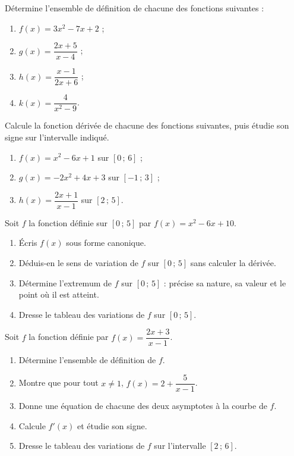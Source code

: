 \documentclass[11pt]{article}
\newcounter{popsec}
\newcounter{popsub}
\newcommand{\courssub}[1]{%
  \stepcounter{popsub}%
  \par\vspace{9pt}\noindent{\popxbold\fontsize{11.5}{13}\selectfont\color{popink}{\color{poporange}\thepopsec.\thepopsub}\hspace{6pt}#1}\par\nopagebreak\vspace{4pt}
}
\begin{document}
\begin{exercice}
Détermine l'ensemble de définition de chacune des fonctions suivantes :
\begin{enumerate}
\item $f(x)=3x^{2}-7x+2$ ;
\item $g(x)=\dfrac{2x+5}{x-4}$ ;
\item $h(x)=\dfrac{x-1}{2x+6}$ ;
\item $k(x)=\dfrac{4}{x^{2}-9}$.
\end{enumerate}
\end{exercice}

\begin{exercice}
Calcule la fonction dérivée de chacune des fonctions suivantes, puis étudie son signe sur l'intervalle indiqué.
\begin{enumerate}
\item $f(x)=x^{2}-6x+1$ sur $[0\,;\,6]$ ;
\item $g(x)=-2x^{2}+4x+3$ sur $[-1\,;\,3]$ ;
\item $h(x)=\dfrac{2x+1}{x-1}$ sur $[2\,;\,5]$.
\end{enumerate}
\end{exercice}

\courssub{Je m'entraîne}

\begin{exercice}
Soit $f$ la fonction définie sur $[0\,;\,5]$ par $f(x)=x^{2}-6x+10$.
\begin{enumerate}
\item Écris $f(x)$ sous forme canonique.
\item Déduis-en le sens de variation de $f$ sur $[0\,;\,5]$ sans calculer la dérivée.
\item Détermine l'extremum de $f$ sur $[0\,;\,5]$ : précise sa nature, sa valeur et le point où il est atteint.
\item Dresse le tableau des variations de $f$ sur $[0\,;\,5]$.
\end{enumerate}
\end{exercice}

\begin{exercice}
Soit $f$ la fonction définie par $f(x)=\dfrac{2x+3}{x-1}$.
\begin{enumerate}
\item Détermine l'ensemble de définition de $f$.
\item Montre que pour tout $x\neq 1$, $f(x)=2+\dfrac{5}{x-1}$.
\item Donne une équation de chacune des deux asymptotes à la courbe de $f$.
\item Calcule $f'(x)$ et étudie son signe.
\item Dresse le tableau des variations de $f$ sur l'intervalle $[2\,;\,6]$.
\end{enumerate}
\end{exercice}
\end{document}
